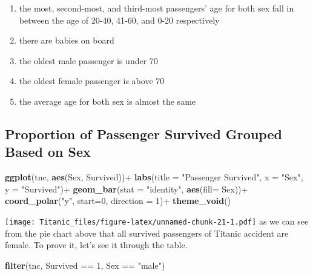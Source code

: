 \documentclass[
]{article}
\newenvironment{Shaded}{\begin{snugshade}}{\end{snugshade}}
\newcommand{\AttributeTok}[1]{\textcolor[rgb]{0.74,0.68,0.62}{#1}}
\newcommand{\DecValTok}[1]{\textcolor[rgb]{0.27,0.67,0.26}{#1}}
\newcommand{\FunctionTok}[1]{\textcolor[rgb]{1.00,0.58,0.35}{\textbf{#1}}}
\newcommand{\NormalTok}[1]{\textcolor[rgb]{0.74,0.68,0.62}{#1}}
\newcommand{\SpecialCharTok}[1]{\textcolor[rgb]{0.02,0.61,0.04}{#1}}
\newcommand{\StringTok}[1]{\textcolor[rgb]{0.02,0.61,0.04}{#1}}
\begin{document}
\begin{enumerate}
\def\labelenumi{\arabic{enumi}.}
\item
  the most, second-most, and third-most passengers' age for both sex
  fall in between the age of 20-40, 41-60, and 0-20 respectively
\item
  there are babies on board
\item
  the oldest male passenger is under 70
\item
  the oldest female passenger is above 70
\item
  the average age for both sex is almost the same
\end{enumerate}

\hypertarget{proportion-of-passenger-survived-grouped-based-on-sex}{%
\subsection{Proportion of Passenger Survived Grouped Based on
Sex}\label{proportion-of-passenger-survived-grouped-based-on-sex}}

\begin{Shaded}
\begin{Highlighting}[]
\FunctionTok{ggplot}\NormalTok{(tnc, }\FunctionTok{aes}\NormalTok{(Sex, Survived))}\SpecialCharTok{+}
  \FunctionTok{labs}\NormalTok{(}\AttributeTok{title =} \StringTok{"Passenger Survived"}\NormalTok{, }
       \AttributeTok{x =} \StringTok{"Sex"}\NormalTok{,}
       \AttributeTok{y =} \StringTok{"Survived"}\NormalTok{)}\SpecialCharTok{+}
  \FunctionTok{geom\_bar}\NormalTok{(}\AttributeTok{stat =} \StringTok{"identity"}\NormalTok{, }\FunctionTok{aes}\NormalTok{(}\AttributeTok{fill=}\NormalTok{ Sex))}\SpecialCharTok{+}
  \FunctionTok{coord\_polar}\NormalTok{(}\StringTok{"y"}\NormalTok{, }\AttributeTok{start=}\DecValTok{0}\NormalTok{, }\AttributeTok{direction =} \DecValTok{1}\NormalTok{)}\SpecialCharTok{+}
  \FunctionTok{theme\_void}\NormalTok{()}
\end{Highlighting}
\end{Shaded}

\texttt{[image: Titanic\_files/figure-latex/unnamed-chunk-21-1.pdf]} as
we can see from the pie chart above that all survived passengers of
Titanic accident are female. To prove it, let's see it through the
table.

\begin{Shaded}
\begin{Highlighting}[]
\FunctionTok{filter}\NormalTok{(tnc, Survived }\SpecialCharTok{==} \DecValTok{1}\NormalTok{, Sex }\SpecialCharTok{==} \StringTok{"male"}\NormalTok{)}
\end{Highlighting}
\end{Shaded}
\end{document}
